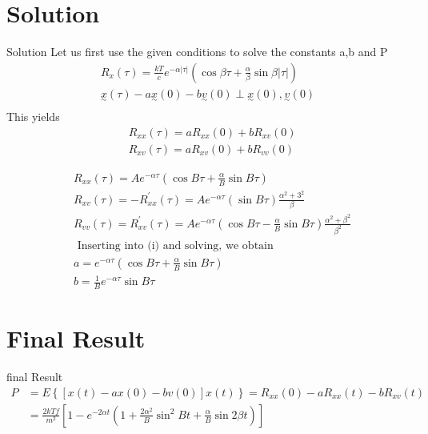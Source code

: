 \documentclass{beamer}
\begin{document}
\section{Solution}
\begin{frame}{Solution}
Let us first use the given conditions to solve the constants a,b and P
	\begin{align}
	R_{x}(\tau)=\frac{k T}{c} e^{-\alpha|\tau|}\left(\cos \beta \tau+\frac{\alpha}{\beta} \sin \beta|\tau|\right) \\
	\underset{\sim}{x}(\tau)-a \underset{\sim}{x}(0)-b \underset{\sim}{v}(0) \perp \underset{\sim}{x}(0), \underset{\sim}{v}(0) \\
	\end{align}
	This yields
	\begin{align}
&R_{x x}(\tau)=a R_{x x}(0)+b R_{x v}(0) \\
&R_{x v}(\tau)=a R_{x v}(0)+b R_{v v}(0)
\end{align}
\end{frame}
\begin{frame}
\begin{align}
&R_{x x}(\tau)=A e^{-\alpha \tau}\left(\cos B \tau+\frac{\alpha}{B} \sin B \tau\right) \\
&R_{x v}(\tau)=-R_{x x}^{\prime}(\tau)=A e^{-\alpha \tau}(\sin B \tau) \frac{\alpha^{2}+3^{2}}{\beta} \\
&R_{v v}(\tau)=R_{x v}^{\prime}(\tau)=A e^{-\alpha \tau}\left(\cos B \tau-\frac{\alpha}{B} \sin B \tau\right) \frac{\alpha^{2}+\beta^{2}}{\beta^{2}} \\
&\text { Inserting into (i) and solving, we obtain } \\
&a=e^{-\alpha \tau}\left(\cos B \tau+\frac{\alpha}{B} \sin B \tau\right) \\
&b=\frac{1}{B} e^{-\alpha \tau} \sin B \tau
\end{align}
\end{frame}
\section{Final Result}
\begin{frame}{final Result}
$$
\begin{aligned}
P &=E\left\{\left[x(t)-a x(0)-bv(0)\right] x(t)\right\}=R_{x x}(0)-a R_{x x}(t)-b R_{x v}(t) \\
&=\frac{2 k T f}{m^{2}}\left[1-e^{-2 \alpha t}\left(1+\frac{2 \alpha^{2}}{B} \sin ^{2} B t+\frac{\alpha}{B} \sin 2 \beta t\right)\right]
\end{aligned}
$$
\end{frame}
\end{document}
